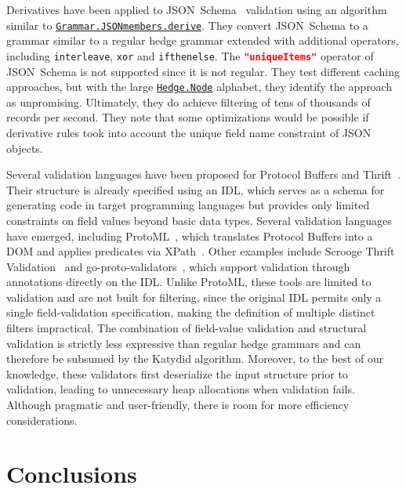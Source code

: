 \documentclass[acmsmall,%
  screen,%
  authorversion, %
  nonacm%
]{acmart}
\newcommand{\link}[2]{\mbox{\hyperref[#2]{\lstinline{#1}}}\xspace}
\newcommand{\Node}{\link{Hedge.Node}{Hedge}}
\newcommand{\JSONmembersRuleDerive}{\link{Grammar.JSONmembers.derive}{def Grammar.JSONmembers.derive}}
\newcommand{\JSONSchema}{%
  JSON~Schema\xspace%
}
\newcommand{\uniqueItems}{%
  \lstinline[language=json]|"uniqueItems"|\xspace%
}
\newcommand{\DOM}{\ac{DOM}\xspace}
\newcommand{\IDL}{\ac{IDL}\xspace}
\newcommand{\JSON}{\ac{JSON}\xspace}
\begin{document}
Derivatives have been applied to JSON~Schema~\cite{holstege2019application} validation using an algorithm similar to \JSONmembersRuleDerive.
They convert \JSONSchema to a grammar similar to a regular hedge grammar extended with additional operators, including \lstinline{interleave}, \lstinline{xor} and \lstinline{ifthenelse}.
The \uniqueItems operator of \JSONSchema is not supported since it is not regular.
They test different caching approaches, but with the large \Node alphabet, they identify the approach as unpromising.
Ultimately, they do achieve filtering of tens of thousands of records per second.
They note that some optimizations would be possible if derivative rules took into account the unique field name constraint of \JSON objects.

Several validation languages have been proposed for Protocol Buffers and Thrift~\cite{thrift}.
Their structure is already specified using an \IDL, which serves as a schema for generating code in target programming languages but provides only limited constraints on field values beyond basic data types.
Several validation languages have emerged, including ProtoML~\cite{kalman2013protoml}, which translates Protocol Buffers into a \DOM and applies predicates via XPath~\cite{xpath}.
Other examples include Scrooge Thrift Validation~\cite{thriftvalidation} and go-proto-validators~\cite{protovalidators}, which support validation through annotations directly on the \IDL.
Unlike ProtoML, these tools are limited to validation and are not built for filtering, since the original \IDL permits only a single field-validation specification, making the definition of multiple distinct filters impractical.
The combination of field-value validation and structural validation is strictly less expressive than regular hedge grammars and can therefore be subsumed by the Katydid algorithm.
Moreover, to the best of our knowledge, these validators first deserialize the input structure prior to validation, leading to unnecessary heap allocations when validation fails.
Although pragmatic and user-friendly, there is room for more efficiency considerations.

\section{Conclusions}
\label{section_future}
\end{document}

